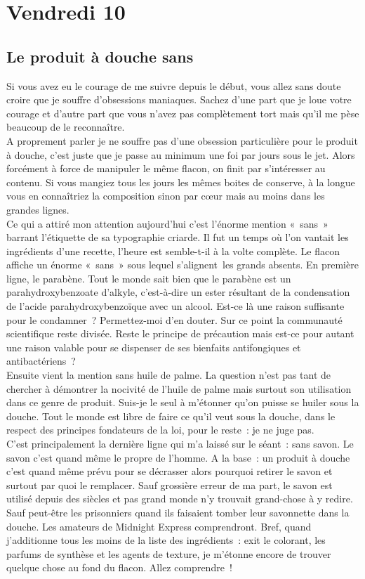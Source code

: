 ﻿\section*{Vendredi 10} 
\subsection*{Le produit à douche sans}
Si vous avez eu le courage de me suivre depuis le début, vous allez sans doute croire que je souffre d’obsessions maniaques. Sachez d’une part que je loue votre courage et d’autre part que vous n’avez pas complètement tort mais qu’il me pèse beaucoup de le reconnaître. \\
A proprement parler je ne souffre pas d’une obsession particulière pour le produit à douche, c’est juste que je passe au minimum une foi par jours sous le jet. Alors forcément à force de manipuler le même flacon, on finit par s’intéresser au contenu. Si vous mangiez tous les jours les mêmes boites de conserve, à la longue vous en connaîtriez la composition sinon par cœur mais au moins dans les grandes lignes. \\
Ce qui a attiré mon attention aujourd’hui c’est l’énorme mention « sans » barrant l’étiquette de sa typographie criarde. Il fut un temps où l’on vantait les ingrédients d’une recette, l’heure est semble-t-il à la volte complète. Le flacon affiche un énorme « sans » sous lequel s’alignent les grands absents.
En première ligne, le parabène. Tout le monde sait bien que le parabène est un parahydroxybenzoate d'alkyle, c'est-à-dire un ester résultant de la condensation de l'acide parahydroxybenzoïque avec un alcool. Est-ce là une raison suffisante pour le condamner ? Permettez-moi d’en douter. Sur ce point la communauté scientifique reste divisée. Reste le principe de précaution mais est-ce pour autant une raison valable pour se dispenser de ses bienfaits antifongiques et antibactériens ? \\
Ensuite vient la mention sans huile de palme. La question n’est pas tant de chercher à démontrer la nocivité de l’huile de palme mais surtout son utilisation dans ce genre de produit. Suis-je le seul à m’étonner qu’on puisse se huiler sous la douche. Tout le monde est libre de faire ce qu’il veut sous la douche, dans le respect des principes fondateurs de la loi, pour le reste : je ne juge pas. \\
C’est principalement la dernière ligne qui m’a laissé sur le séant : sans savon. Le savon c’est quand même le propre de l’homme. A la base : un produit à douche c’est quand même prévu pour se décrasser alors pourquoi retirer le savon et surtout par quoi le remplacer. Sauf grossière erreur de ma part, le savon est utilisé depuis des siècles et pas grand monde n’y trouvait grand-chose à y redire. Sauf peut-être les prisonniers quand ils faisaient tomber leur savonnette dans la douche. Les amateurs de Midnight Express comprendront.
Bref, quand j’additionne tous les moins de la liste des ingrédients : exit le colorant, les parfums de synthèse et les agents de texture, je m’étonne encore de trouver quelque chose au fond du flacon. Allez comprendre ! 
